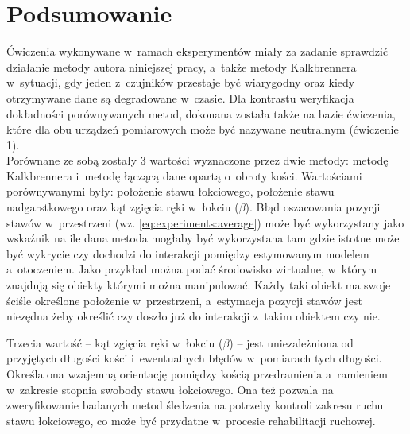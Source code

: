 \section{Podsumowanie}
																								
Ćwiczenia wykonywane w~ramach eksperymentów miały za zadanie sprawdzić działanie metody autora niniejszej pracy, a~także metody Kalkbrennera w~sytuacji, gdy jeden z~czujników przestaje być wiarygodny oraz kiedy otrzymywane dane są degradowane w~czasie. Dla kontrastu weryfikacja dokładności porównywanych metod, dokonana została także na bazie ćwiczenia, które dla obu urządzeń pomiarowych może być nazywane neutralnym (ćwiczenie 1).\\
																								
Porównane ze sobą zostały 3 wartości wyznaczone przez dwie metody: metodę Kalkbrennera i~metodę łączącą dane opartą o~obroty kości. Wartościami porównywanymi były: położenie stawu łokciowego, położenie stawu nadgarstkowego oraz kąt zgięcia ręki w~łokciu ($\beta$). Błąd oszacowania pozycji stawów w~przestrzeni (wz. \ref{eq:experiments:average}) może być wykorzystany jako wskaźnik na ile dana metoda mogłaby być wykorzystana tam gdzie istotne może być wykrycie czy dochodzi do interakcji pomiędzy estymowanym modelem a~otoczeniem. Jako przykład można podać środowisko wirtualne, w~którym znajdują się obiekty którymi można manipulować. Każdy taki obiekt ma swoje ściśle określone położenie w~przestrzeni, a~estymacja pozycji stawów jest niezędna żeby określić czy doszło już do interakcji z~takim obiektem czy nie.
																								 
Trzecia wartość -- kąt zgięcia ręki w~łokciu ($\beta$) -- jest uniezależniona od przyjętych długości kości i~ewentualnych błędów w~pomiarach tych długości. Określa ona wzajemną orientację pomiędzy kością przedramienia a~ramieniem w~zakresie stopnia swobody stawu łokciowego. Ona też pozwala na zweryfikowanie badanych metod śledzenia na potrzeby kontroli zakresu ruchu stawu łokciowego, co może być przydatne w~procesie rehabilitacji ruchowej. \\ 


